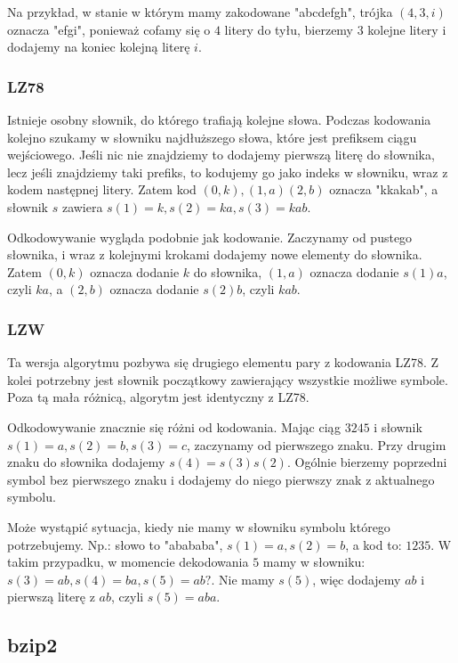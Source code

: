 \documentclass{../notatki}
\begin{document}
Na przykład, w stanie w którym mamy zakodowane "abcdefgh", trójka $(4, 3, i)$
oznacza "efgi", ponieważ cofamy się o $4$ litery do tyłu, bierzemy $3$ kolejne
litery i dodajemy na koniec kolejną literę $i$.

\subsubsection{LZ78}

Istnieje osobny słownik, do którego trafiają kolejne słowa. Podczas kodowania
kolejno szukamy w słowniku najdłuższego słowa, które jest prefiksem ciągu
wejściowego. Jeśli nic nie znajdziemy to dodajemy pierwszą literę do słownika,
lecz jeśli znajdziemy taki prefiks, to kodujemy go jako indeks w słowniku,
wraz z kodem następnej litery. Zatem kod $(0,k),(1,a)(2,b)$ oznacza "kkakab",
a słownik $s$ zawiera $s(1)=k,s(2)=ka,s(3)=kab$.

Odkodowywanie wygląda podobnie jak kodowanie. Zaczynamy od pustego słownika,
i wraz z kolejnymi krokami dodajemy nowe elementy do słownika. Zatem
$(0,k)$ oznacza dodanie $k$ do słownika, $(1,a)$ oznacza dodanie
$s(1)a$, czyli
$ka$, a $(2,b)$ oznacza dodanie $s(2)b$, czyli $kab$.

\subsubsection{LZW}

Ta wersja algorytmu pozbywa się drugiego elementu pary z kodowania LZ78.
Z kolei potrzebny jest słownik początkowy zawierający wszystkie możliwe
symbole. Poza tą mała różnicą, algorytm jest identyczny z LZ78.

Odkodowywanie znacznie się różni od kodowania. Mając ciąg $3245$ i
słownik $s(1)=a,s(2)=b,s(3)=c$, zaczynamy od pierwszego znaku.
Przy drugim znaku do słownika dodajemy $s(4)=s(3)s(2)$. Ogólnie bierzemy
poprzedni symbol bez pierwszego znaku i dodajemy do niego pierwszy znak
z aktualnego symbolu.

Może wystąpić sytuacja, kiedy nie mamy w słowniku symbolu którego
potrzebujemy.
Np.: słowo to "abababa", $s(1)=a,s(2)=b$, a kod to: $1235$. W takim
przypadku, w momencie dekodowania $5$ mamy w słowniku:
$s(3)=ab,s(4)=ba,s(5)=ab?$. Nie mamy $s(5)$, więc dodajemy $ab$ i pierwszą
literę z $ab$, czyli $s(5)=aba$.

\subsection{bzip2}
\end{document}
